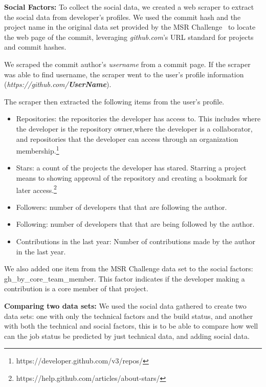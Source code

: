 \documentclass[10pt, conference]{IEEEtran}
\begin{document}
\textbf{Social Factors:} To collect the social data, we created a web scraper to extract the social data
from developer's profiles.
We used the commit hash and the project name in the original data
set provided by the MSR Challenge~\cite{msr17challenge} to locate the web page
of the commit, leveraging \textit{github.com}'s URL standard for projects and
commit hashes.

We scraped the commit author's
\textit{username} from a commit page. If the scraper was able to find username, the
scraper went to the user's profile information
(\textit{https://github.com/\textbf{UserName}}). 

The scraper then extracted the following items from the user's
profile.

\begin{itemize}
\item Repositories: the repositories the developer has access to. This 
includes where the developer is the repository owner,where the developer is a 
collaborator, and repositories that the developer can access through an 
organization membership.\footnote{https://developer.github.com/v3/repos/}
\item Stars: a count of the projects the developer has stared. Starring  a project
means to showing approval of the repository and creating a bookmark for later 
access.\footnote{https://help.github.com/articles/about-stars/}
\item Followers: number of developers that that are following the author. 
\item Following: number of developers that that are being followed by the author.
\item Contributions in the last year: Number of contributions made by the author in the last year.
\end{itemize}


We also added one item from the MSR Challenge data set to the social factors:
gh\_by\_core\_team\_member.
This factor indicates if the developer making a contribution is a core member 
of that project.

\textbf{Comparing two data sets:} We used the social data gathered to create two data 
sets: one with only the technical
factors and the build status, and another with both the technical and social
factors, this is to be able to compare how well can the job status be predicted 
by just technical data, and adding social data.
\end{document}
